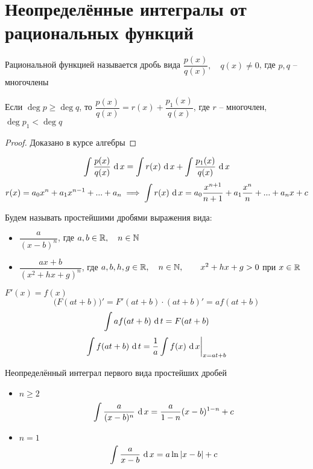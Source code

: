 \section{Неопределённые интегралы от рациональных функций}

\begin{definition}
    Рациональной функцией называется дробь вида $ \dfrac{p(x)}{q(x)}, \quad q(x) \ne 0 $, где $p, q$ -- многочлены
\end{definition}

\begin{theorem}
	Если $ \deg p \ge \deg q$, то $ \dfrac{p(x)}{q(x)} = r(x) + \dfrac{p_1(x)}{q(x)}$, где $r$ -- многочлен, $ \deg p_1 < \deg q $
\end{theorem}

\begin{proof}
	Доказано в курсе алгебры
\end{proof}

\begin{theorem}
    $$ \uint{ \dfrac{p(x)}{q(x)} } = \uint{r(x)} + \uint{ \dfrac{p_1(x)}{q(x)}} $$
    $$ r(x) = a_0x^n + a_1x^{n - 1} + ... + a_n \implies \uint{r(x)} = a_0 \dfrac{x^{n + 1}}{n + 1} + a_1 \dfrac{x^n}n + ... + a_nx + c $$
\end{theorem}

\begin{definition}
    Будем называть простейшими дробями выражения вида:
    \begin{itemize}
    	\item $ \dfrac{a}{(x - b)^n}$, где $a, b \in \R, \quad n \in \N $
        \item $ \dfrac{ax + b}{(x^2 + hx + g)^n} $, где $a, b, h, g \in \R, \quad n \in \N, \qquad x^2 + hx + g > 0 $ при $x \in \R $
    \end{itemize}
\end{definition}

\begin{remark}
	$ F'(x) = f(x) $
    $$ \bigg( F(at + b) \bigg)' = F'(at + b) \cdot (at + b)' = af(at + b) $$
    $$ \uint[t]{af(at + b)} = F(at + b) $$
    $$ \uint[t]{f(at + b)} = \frac1a \uint{f(x)} \clamp{x = at + b} $$
\end{remark}

\begin{undefthm}{Неопределённый интеграл первого вида простейших дробей}
    \hfill
    \begin{itemize}
    	\item $n \ge 2 $
        $$ \uint{\frac{a}{(x - b)^n}} = \frac{a}{1 - n}(x - b)^{1 - n} + c $$
        \item $ n = 1$
        $$ \uint{\frac{a}{x - b}} = a \ln |x - b| + c $$
    \end{itemize}
\end{undefthm}

